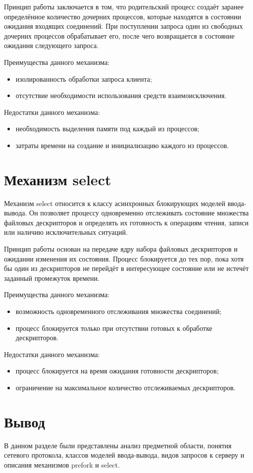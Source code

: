 Принцип работы заключается в том, что родительский процесс создаёт заранее определённое количество дочерних процессов, которые находятся в состоянии ожидания входящих соединений. При поступлении запроса один из свободных дочерних процессов обрабатывает его, после чего возвращается в состояние ожидания следующего запроса.

Преимущества данного механизма:
\begin{itemize}
	\item изолированность обработки запроса клиента;
	\item отсутствие необходимости использования средств взаимоисключения.
\end{itemize}

Недостатки данного механизма:
\begin{itemize}
	\item необходимость выделения памяти под каждый из процессов;
	\item затраты времени на создание и инициализацию каждого из процессов.
\end{itemize}

\section{Механизм select}

Механизм select относится к классу асинхронных блокирующих моделей ввода-вывода. Он позволяет процессу одновременно отслеживать состояние множества файловых дескрипторов и определять их готовность к операциям чтения, записи или наличию исключительных ситуаций.

Принцип работы основан на передаче ядру набора файловых дескрипторов и ожидании изменения их состояния. Процесс блокируется до тех пор, пока хотя бы один из дескрипторов не перейдёт в интересующее состояние или не истечёт заданный промежуток времени.

Преимущества данного механизма:
\begin{itemize}
	\item возможность одновременного отслеживания множества соединений;
	\item процесс блокируется только при отсутствии готовых к обработке дескрипторов.
\end{itemize}

Недостатки данного механизма:
\begin{itemize}
	\item процесс блокируется на время ожидания готовности дескрипторов;
	\item ограничение на максимальное количество отслеживаемых дескрипторов.
\end{itemize}

\section*{Вывод}

В данном разделе были представлены анализ предметной области, понятия сетевого протокола, классов моделей ввода-вывода, видов запросов к серверу и описания механизмов prefork и select.
